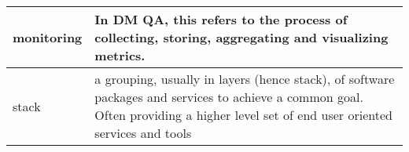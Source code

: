 \begin{longtable}{|p{}|p{}|}
monitoring & In DM QA, this refers to the process of collecting, storing, aggregating and visualizing metrics. \\\hline
stack & a grouping, usually in layers (hence stack), of software packages and services to achieve a common goal. Often providing a higher level set of end user oriented services and tools \\\hline
\end{longtable}
